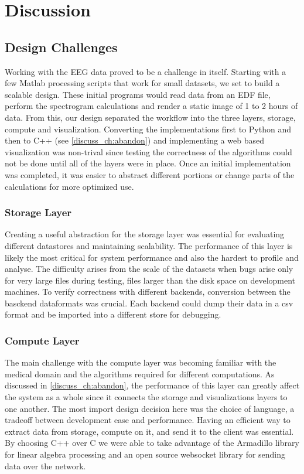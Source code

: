 \chapter{Discussion}\label{discuss_ch}

\section{Design Challenges}

Working with the EEG data proved to be a challenge in itself. Starting with a
few Matlab processing scripts that work for small datasets, we set to build a
scalable design. These initial programs would read data from an EDF file,
perform the spectrogram calculations and render a static image of 1 to 2 hours
of data. From this, our design separated the workflow into the three layers,
storage, compute and visualization. Converting the implementations first to
Python and then to C++ (see \ref{discuss_ch:abandon}) and implementing a web based
visualization was non-trival since testing the correctness of the algorithms
could not be done until all of the layers were in place. Once an initial
implementation was completed, it was easier to abstract different portions or
change parts of the calculations for more optimized use. \\

\subsection{Storage Layer}

Creating a useful abstraction for the storage layer was essential for
evaluating different datastores and maintaining scalability. The performance of
this layer is likely the most critical for system performance and also the
hardest to profile and analyse. The difficulty arises from the scale of the
datasets when bugs arise only for very large files during testing, files larger
than the disk space on development machines. To verify correctness with
different backends, conversion between the basckend dataformats was crucial.
Each backend could dump their data in a csv format and be imported into a
different store for debugging.

\subsection{Compute Layer}

The main challenge with the compute layer was becoming familiar with the
medical domain and the algorithms required for different computations. As
discussed in \ref{discuss_ch:abandon}, the performance of this layer can greatly
affect the system as a whole since it connects the storage and visualizations
layers to one another. The most import design decision here was the choice of
language, a tradeoff between development ease and performance. Having an
efficient way to extract data from storage, compute on it, and send it to the
client was essential. By choosing C++ over C we were able to take advantage of
the Armadillo \cite{arma} library for linear algebra processing and an open source
websocket library \cite{websocket-server} for sending data over the network.

